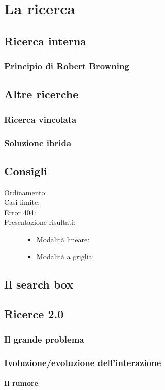 
\chapter{La ricerca}

	\section{Ricerca interna}
	
		\subsection{Principio di Robert Browning}
	
	\section{Altre ricerche}
	
		\subsection{Ricerca vincolata}
		
		\subsection{Soluzione ibrida}
		
	\section{Consigli}
		\begin{description}
			\item[Ordinamento:]
			\item[Casi limite:]
			\item[Error 404:]
			\item[Presentazione risultati:]
				\begin{itemize}
					\item Modalità lineare:
					\item Modalità a griglia:
				\end{itemize}
		\end{description}
		
	\section{Il search box}
	
	\section{Ricerce 2.0}
	
		\subsection{Il grande problema}
		
		\subsection{Ivoluzione/evoluzione dell'interazione}
		
			\subsubsection{Il rumore}